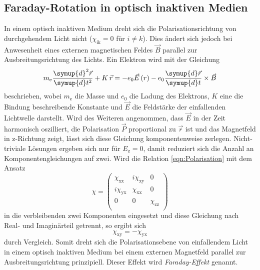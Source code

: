 \subsection{Faraday-Rotation in optisch inaktiven Medien}
\label{sec:Theo22}

In einem optisch inaktiven Medium dreht sich die Polarisationsrichtung von
durchgehendem Licht nicht ($\chi_\text{ik} = 0$ für $i \neq k$).
Dies ändert sich jedoch bei Anwesenheit eines externen magnetischen Feldes $\vec{B}$
parallel zur Ausbreitungsrichtung des Lichts.
Ein Elektron wird mit der Gleichung
\begin{equation*}
  m_\text{e} \frac{\symup{d}^2 \vec{r}}{\symup{d} t^2} + K \, \vec{r} =
  - e_0 \vec{E}\left(r\right)
  - e_0 \frac{\symup{d} \vec{r}}{\symup{d} t} \times \vec{B}
\end{equation*}
beschrieben, wobei $m_\text{e}$ die Masse und $e_0$ die Ladung des Elektrons,
$K$ eine die Bindung beschreibende Konstante und
$\vec{E}$ die Feldstärke der einfallenden Lichtwelle darstellt.
Wird des Weiteren angenommen, dass $\vec{E}$ in der Zeit harmonisch
oszilliert, die Polarisation $\vec{P}$ proportional zu $\vec{r}$ ist
und das Magnetfeld in z-Richtung zeigt, lässt sich diese Gleichung
komponentenweise zerlegen.
Nicht-triviale Lösungen ergeben sich nur für $E_\text{z} = 0$,
damit reduziert sich die Anzahl an Komponentengleichungen auf zwei.
Wird die Relation \eqref{eqn:Polarisation} mit dem Ansatz
\begin{equation*}
  \chi =
  \begin{pmatrix}
    \chi_\text{xx} & i \chi_\text{xy} & 0 \\
    i \chi_\text{yx} & \chi_\text{xx} & 0 \\
    0 & 0 & \chi_\text{zz} \\
  \end{pmatrix}
\end{equation*}
in die verbleibenden zwei Komponenten eingesetzt und diese Gleichung
nach Real- und Imaginärteil getrennt, so ergibt sich
\begin{equation*}
  \chi_\text{xy} = - \chi_\text{yx}
\end{equation*}
durch Vergleich.
Somit dreht sich die Polarisationsebene von einfallendem Licht in einem
optisch inaktiven Medium bei einem externen Magnetfeld parallel zur
Ausbreitungsrichtung prinzipiell.
Dieser Effekt wird \emph{Faraday-Effekt} genannt.

